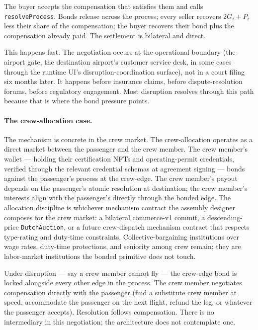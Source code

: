 \documentclass[11pt,a4paper]{article}
\theoremstyle{definition}
\theoremstyle{remark}
\begin{document}
The buyer accepts the compensation that satisfies them and calls
\texttt{resolveProcess}. Bonds release across the process; every
seller recovers $2G_i + P_i$ less their share of the
compensation; the buyer recovers their bond plus the compensation
already paid. The settlement is bilateral and direct.

This happens fast. The negotiation occurs at the operational
boundary (the airport gate, the destination airport's customer
service desk, in some cases through the runtime UI's
disruption-coordination surface), not in a court filing six
months later. It happens before insurance claims, before
dispute-resolution forums, before regulatory engagement. Most
disruption resolves through this path because that is where the
bond pressure points.

\paragraph{The crew-allocation case.}
The mechanism is concrete in the crew market. The crew-allocation
operates as a direct market between the passenger and the crew
member. The crew member's wallet --- holding their certification
NFTs and operating-permit credentials, verified through the
relevant credential schemas at agreement signing --- bonds
against the passenger's process at the crew-edge. The crew
member's payout depends on the passenger's atomic resolution at
destination; the crew member's interests align with the
passenger's directly through the bonded edge. The allocation
discipline is whichever mechanism contract the assembly designer
composes for the crew market: a bilateral commerce-v1 commit, a
descending-price \texttt{DutchAuction}, or a future
crew-dispatch mechanism contract that respects type-rating and
duty-time constraints. Collective-bargaining institutions over
wage rates, duty-time protections, and seniority among crew
remain; they are labor-market institutions the bonded primitive
does not touch.

Under disruption --- say a crew member cannot fly --- the
crew-edge bond is locked alongside every other edge in the
process. The crew member negotiates compensation directly with
the passenger (find a substitute crew member at speed,
accommodate the passenger on the next flight, refund the leg, or
whatever the passenger accepts). Resolution follows compensation.
There is no intermediary in this negotiation; the architecture
does not contemplate one.
\end{document}
